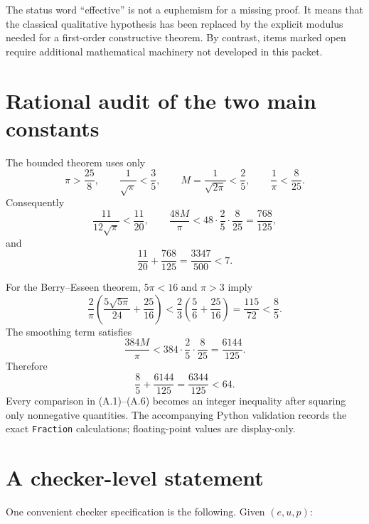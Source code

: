 \documentclass[11pt]{article}
\newcommand{\code}[1]{\nolinkurl{#1}}
\begin{document}
The status word ``effective'' is not a euphemism for a missing proof.  It
means that the classical qualitative hypothesis has been replaced by the
explicit modulus needed for a first-order constructive theorem.  By contrast,
items marked open require additional mathematical machinery not developed in
this packet.

\appendix

\section{Rational audit of the two main constants}
\label{app:constants}

The bounded theorem uses only
\[
 \pi>\frac{25}{8},
 \qquad \frac1{\sqrt\pi}<\frac35,
 \qquad M=\frac1{\sqrt{2\pi}}<\frac25,
 \qquad \frac1\pi<\frac8{25}.                         \tag{A.1}
\]
Consequently
\[
 \frac{11}{12\sqrt\pi}<\frac{11}{20},
 \qquad
 \frac{48M}{\pi}<48\cdot\frac25\cdot\frac8{25}
 =\frac{768}{125},                                    \tag{A.2}
\]
and
\[
 \frac{11}{20}+\frac{768}{125}
 =\frac{3347}{500}<7.                                 \tag{A.3}
\]

For the Berry--Esseen theorem, \(5\pi<16\) and \(\pi>3\) imply
\[
 \frac{2}{\pi}
 \left(\frac{5\sqrt{5\pi}}{24}+\frac{25}{16}\right)
 <\frac23\left(\frac56+\frac{25}{16}\right)
 =\frac{115}{72}<\frac85.                             \tag{A.4}
\]
The smoothing term satisfies
\[
 \frac{384M}{\pi}
 <384\cdot\frac25\cdot\frac8{25}
 =\frac{6144}{125}.                                   \tag{A.5}
\]
Therefore
\[
 \frac85+\frac{6144}{125}
 =\frac{6344}{125}<64.                                \tag{A.6}
\]
Every comparison in (A.1)--(A.6) becomes an integer inequality after
squaring only nonnegative quantities.  The accompanying Python validation
records the exact \code{Fraction} calculations; floating-point values are
display-only.

\section{A checker-level statement}
\label{app:checker}

One convenient checker specification is the following.  Given
\((e,u,p)\):
\end{document}
